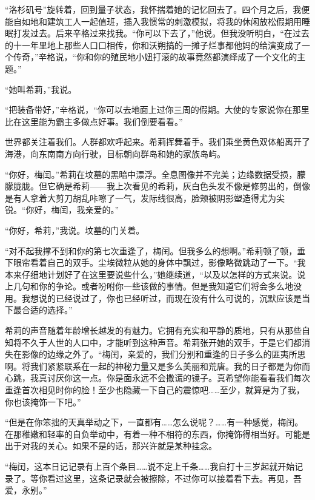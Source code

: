 \documentclass[AutoFakeBold=true]{book}
\begin{document}
``洛杉矶号''旋转着，回到量子状态，我怀揣着她的记忆回去了。四个月之后，我便能自如地和建筑工人一起值班，插入我惯常的刺激模拟，将我的休闲放松假期用睡眠打发过去。后来辛格过来找我。``你可以下去了，''他说。但我没听明白，``在过去的十一年里地上那些人口口相传，你和沃朔搞的一摊子烂事都他妈的给演变成了一个传奇，''辛格说，``你和你的殖民地小妞打滚的故事竟然都演绎成了一个文化的主题。''

``她叫希莉，''我说。

``把装备带好，''辛格说，``你可以去地面上过你三周的假期。大使的专家说你在那里比在这里能为霸主多做点好事。我们倒要看看。''

世界都关注着我们。人群都欢呼起来。希莉挥舞着手。我们乘坐黄色双体船离开了海港，向东南南方向行驶，目标朝向群岛和她的家族岛屿。

\vspace*{1em}

``你好，梅闰。''希莉在坟墓的黑暗中漂浮。全息图像并不完美；边缘数据受损，朦朦胧胧。但它确是希莉——我上次看见的希莉，灰白色头发不像是修剪出的，倒像是有人拿着大剪刀胡乱咔嚓了一气，发际线很高，脸颊被阴影塑造得尤为尖锐。``你好，梅闰，我亲爱的。''

``你好，希莉，''我说。坟墓的门关着。

``对不起我撑不到和你的第七次重逢了，梅闰。但我多么的想啊。''希莉顿了顿，垂下眼帘看着自己的双手。尘埃微粒从她的身体中飘过，影像略微跳动了一下。``我本来仔细地计划好了在这里要说些什么，''她继续道，``以及以怎样的方式来说。说上几句和你的争论。或者吩咐你一些该做的事情。但是我知道它们将会多么地没用。我想说的已经说过了，你也已经听过，而现在没有什么可说的，沉默应该是当下最合适的选择。''

希莉的声音随着年龄增长越发的有魅力。它拥有充实和平静的质地，只有从那些自知将不久于人世的人口中，才能听到这种声音。希莉张开她的双手，于是它们都消失在影像的边缘之外了。``梅闰，亲爱的，我们分别和重逢的日子多么的匪夷所思啊。将我们紧紧联系在一起的神秘力量又是多么美丽和荒唐。我的日子都是为你而心跳，我真讨厌你这一点。你是面永远不会撒谎的镜子。真希望你能看看我们每次重逢首次相见时你的脸！至少也隐藏一下自己的震惊吧……至少，就算是为了我，你也该掩饰一下吧。''

``但是在你笨拙的天真举动之下，一直都有……怎么说呢？……有一种感觉，梅闰。在那稚嫩和轻率的自负举动中，有着一种不相符的东西，你掩饰得相当好。可能是出于对我的关心。如果不是的话，那兴许就是某种挂念。

``梅闰，这本日记记录有上百个条目……说不定上千条……我自打十三岁起就开始记录了。等你看过这里，这条记录就会被擦除，不过你可以接着看下去。再见，吾爱，永别。''
\end{document}

